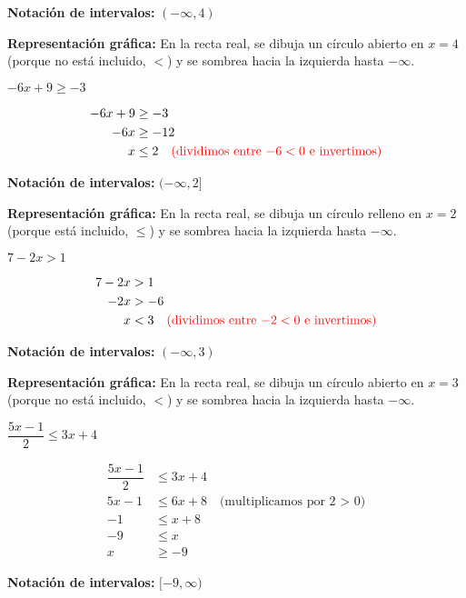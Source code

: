 \begin{exercise}
\begin{solucion}
\textbf{Notación de intervalos:} $(-\infty, 4)$

\textbf{Representación gráfica:} En la recta real, se dibuja un círculo abierto en $x = 4$ (porque no está incluido, $<$) y se sombrea hacia la izquierda hasta $-\infty$.
\end{solucion}

\problem $-6x + 9 \ge -3$

\begin{solucion}
\begin{align*}
-6x + 9 &\ge -3 \\
-6x &\ge -12 \\
x &\le 2 \quad \textcolor{red}{\text{(dividimos entre $-6 < 0$ e invertimos)}}
\end{align*}

\textbf{Notación de intervalos:} $(-\infty, 2]$

\textbf{Representación gráfica:} En la recta real, se dibuja un círculo relleno en $x = 2$ (porque está incluido, $\le$) y se sombrea hacia la izquierda hasta $-\infty$.
\end{solucion}

\problem $7 - 2x > 1$

\begin{solucion}
\begin{align*}
7 - 2x &> 1 \\
-2x &> -6 \\
x &< 3 \quad \textcolor{red}{\text{(dividimos entre $-2 < 0$ e invertimos)}}
\end{align*}

\textbf{Notación de intervalos:} $(-\infty, 3)$

\textbf{Representación gráfica:} En la recta real, se dibuja un círculo abierto en $x = 3$ (porque no está incluido, $<$) y se sombrea hacia la izquierda hasta $-\infty$.
\end{solucion}

\problem $\dfrac{5x - 1}{2} \le 3x + 4$

\begin{solucion}
\begin{align*}
\dfrac{5x - 1}{2} &\le 3x + 4 \\
5x - 1 &\le 6x + 8 \quad \text{(multiplicamos por 2 > 0)} \\
-1 &\le x + 8 \\
-9 &\le x \\
x &\ge -9
\end{align*}

\textbf{Notación de intervalos:} $[-9, \infty)$


\end{solucion}
\end{exercise}
